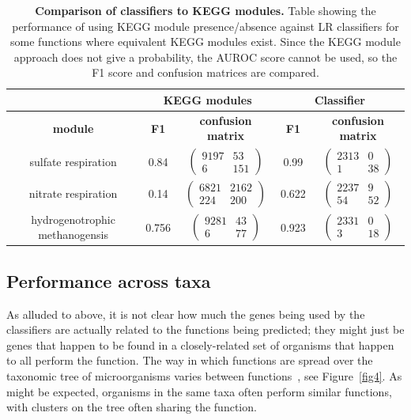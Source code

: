 \documentclass[10pt,letterpaper]{article}
\begin{document}
\begin{table}
\scriptsize
\begin{tabular}{|c|c|c|c|c|}\cline{2-5}%

 \multicolumn{1}{c|}{} &  \multicolumn{2}{|c|}{\bfseries KEGG modules} & \multicolumn{2}{|c|}{\bfseries Classifier} \\ \hline
 \rowcolor{LightGray} \bfseries module & \bfseries F1 & \bfseries confusion matrix & \bfseries F1 & \bfseries confusion matrix \\\hline
sulfate respiration & 0.84 & $\begin{pmatrix}9197 & 53 \\ 6 & 151\end{pmatrix}$ & 0.99 & $\begin{pmatrix}2313 & 0 \\ 1 & 38\end{pmatrix}$\\ \hline
nitrate respiration & 0.14 & $\begin{pmatrix}6821 & 2162\\ 224 & 200\end{pmatrix}$ & 0.622 & $\begin{pmatrix}2237 & 9 \\ 54 & 52\end{pmatrix}$\\ \hline
hydrogenotrophic methanogensis & 0.756 & $\begin{pmatrix}9281 & 43 \\ 6 & 77\end{pmatrix}$ & 0.923 & $\begin{pmatrix} 2331 & 0\\ 3 & 18\end{pmatrix}$\\ \hline
\end{tabular}

\caption{{\bf Comparison of classifiers to KEGG modules.}
Table showing the performance of using KEGG module presence/absence against LR classifiers for some functions where equivalent KEGG modules exist. Since the KEGG module approach does not give a probability, the AUROC score cannot be used, so the F1 score and confusion matrices are compared.}\label{tab2}
\end{table}

\subsection*{Performance across taxa}
As alluded to above, it is not clear how much the genes being used by the classifiers are actually related to the functions being predicted; they might just be genes that happen to be found in a closely-related set of organisms that happen to all perform the function. The way in which functions are spread over the taxonomic tree of microorganisms varies between functions~\cite{Martiny2015}, see Figure~\ref{fig4}. As might be expected, organisms in the same taxa often perform similar functions, with clusters on the tree often sharing the function.
\end{document}
